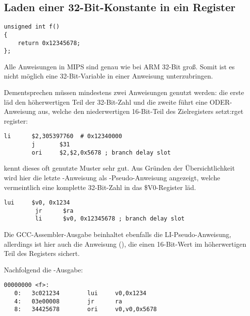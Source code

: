 ﻿\subsection{Laden einer 32-Bit-Konstante in ein Register}
\label{MIPS_big_constants}

\begin{lstlisting}[style=customc]
unsigned int f()
{
	return 0x12345678;
};
\end{lstlisting}

Alle Anweisungen in MIPS sind genau wie bei ARM 32-Bit groß. Somit ist es nicht
möglich eine 32-Bit-Variable in einer Anweisung unterzubringen.

Dementsprechen müssen mindestens zwei Anweisungen genutzt werden:
die erste läd den höherwertigen Teil der 32-Bit-Zahl und die zweite führt eine
ODER-Anweisung aus, welche den niederwertigen 16-Bit-Teil des Zielregisters setzt:rget register:

\begin{lstlisting}[caption=GCC 4.4.5 -O3 (\assemblyOutput),style=customasmMIPS]
        li      $2,305397760  # 0x12340000
        j       $31
        ori     $2,$2,0x5678 ; branch delay slot
\end{lstlisting}

\IDA kennt dieses oft genutzte Muster sehr gut. Aus Gründen der Übersichtlichkeit
wird hier die letzte -Anweisung als -Pseudo-Anweisung angezeigt,
welche vermeintlich eine komplette 32-Bit-Zahl in das \$V0-Register läd.


\begin{lstlisting}[caption=GCC 4.4.5 -O3 (IDA),style=customasmMIPS]
         lui     $v0, 0x1234
         jr      $ra
         li      $v0, 0x12345678 ; branch delay slot
\end{lstlisting}

Die GCC-Assembler-Ausgabe beinhaltet ebenfalls die LI-Pseudo-Anweisung, allerdings
ist hier auch die Anweisung  (), die einen 16-Bit-Wert
im höherwertigen Teil des Registers sichert.

Nachfolgend die -Ausgabe:

\begin{lstlisting}[caption=objdump,style=customasmMIPS]
00000000 <f>:
   0:   3c021234        lui     v0,0x1234
   4:   03e00008        jr      ra
   8:   34425678        ori     v0,v0,0x5678
\end{lstlisting}

